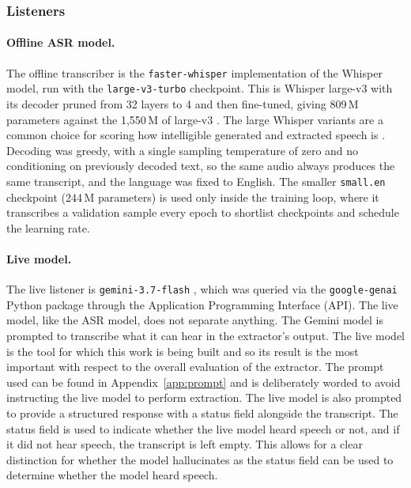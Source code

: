   \subsubsection{Listeners}
  \label{sec:transcription}

  \paragraph{Offline ASR model.}
  \label{sec:offline_asr}
  The offline transcriber is the \texttt{faster-whisper} implementation \cite{faster_whisper} of the Whisper \cite{radford2023whisper} model, run with the \texttt{large-v3-turbo} checkpoint. This is Whisper large-v3 with its decoder pruned from 32 layers to 4 and then fine-tuned, giving 809\,M parameters against the 1{,}550\,M of large-v3 \cite{whisper_turbo}. The large Whisper variants are a common choice for scoring how intelligible generated and extracted speech is \cite{anastassiou2024seedtts,wang2025solospeech}. Decoding was greedy, with a single sampling temperature of zero and no conditioning on previously decoded text, so the same audio always produces the same transcript, and the language was fixed to English. The smaller \texttt{small.en} checkpoint (244\,M parameters) is used only inside the training loop, where it transcribes a validation sample every epoch to shortlist checkpoints and schedule the learning rate. 


  \paragraph{Live model.}
  \label{sec:live_judge}
  The live listener is \texttt{gemini-3.7-flash} \cite{google2026geminiflash}, which was queried via the \texttt{google-genai} Python package through the Application Programming Interface (API). The live model, like the ASR model, does not separate anything. The Gemini model is prompted to transcribe what it can hear in the extractor's output. The live model is the tool for which this work is being built and so its result is the most important with respect to the overall evaluation of the extractor. The prompt used can be found in Appendix~\ref{app:prompt} and is deliberately worded to avoid instructing the live model to perform extraction. The live model is also prompted to provide a structured response with a status field alongside the transcript. The status field is used to indicate whether the live model heard speech or not, and if it did not hear speech, the transcript is left empty. This allows for a clear distinction for whether the model hallucinates as the status field can be used to determine whether the model heard speech.

